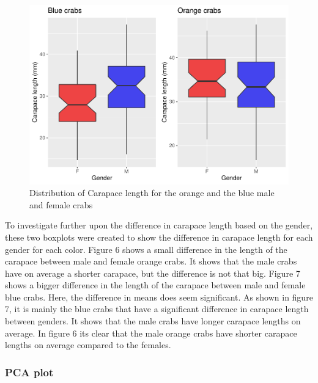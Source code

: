 \documentclass[
]{article}
\begin{document}
\begin{figure}[H]

{\centering \includegraphics{Log_files/figure-latex/figure6-1} 

}

\caption{Distribution of Carapace length for the orange and the blue male and female crabs}\label{fig:figure6}
\end{figure}

To investigate further upon the difference in carapace length based on
the gender, these two boxplots were created to show the difference in
carapace length for each gender for each color. Figure 6 shows a small
difference in the length of the carapace between male and female orange
crabs. It shows that the male crabs have on average a shorter carapace,
but the difference is not that big. Figure 7 shows a bigger difference
in the length of the carapace between male and female blue crabs. Here,
the difference in means does seem significant. As shown in figure 7, it
is mainly the blue crabs that have a significant difference in carapace
length between genders. It shows that the male crabs have longer
carapace lengths on average. In figure 6 its clear that the male orange
crabs have shorter carapace lengths on average compared to the females.
\newpage

\hypertarget{pca-plot}{%
\subsubsection{PCA plot}\label{pca-plot}}
\end{document}
